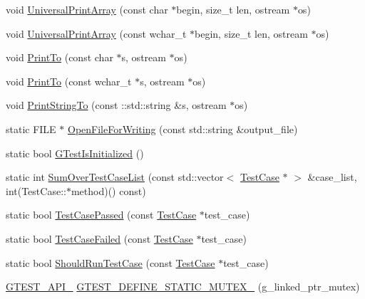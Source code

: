 \begin{DoxyCompactItemize}
\item 
void \mbox{\hyperlink{namespacetesting_1_1internal_a070107e7a8205ad6ec4d538d52b15b38}{Universal\+Print\+Array}} (const char $\ast$begin, size\+\_\+t len, ostream $\ast$os)
\item 
void \mbox{\hyperlink{namespacetesting_1_1internal_a52394019018eb5079f9f1bcca23dcd60}{Universal\+Print\+Array}} (const wchar\+\_\+t $\ast$begin, size\+\_\+t len, ostream $\ast$os)
\item 
void \mbox{\hyperlink{namespacetesting_1_1internal_adc6c98306d40b53fd07be4e295102a0a}{Print\+To}} (const char $\ast$s, ostream $\ast$os)
\item 
void \mbox{\hyperlink{namespacetesting_1_1internal_afc20fb56b2547a8f91f9ff99650f2024}{Print\+To}} (const wchar\+\_\+t $\ast$s, ostream $\ast$os)
\item 
void \mbox{\hyperlink{namespacetesting_1_1internal_ad609167d8d6792b0fb186539e0e159bd}{Print\+String\+To}} (const \+::std\+::string \&s, ostream $\ast$os)
\item 
static F\+I\+LE $\ast$ \mbox{\hyperlink{namespacetesting_1_1internal_ad2067b047293fd5061a48675982d9ff2}{Open\+File\+For\+Writing}} (const std\+::string \&output\+\_\+file)
\item 
static bool \mbox{\hyperlink{namespacetesting_1_1internal_a91e707e0d371fae0224ffd37f0d042af}{G\+Test\+Is\+Initialized}} ()
\item 
static int \mbox{\hyperlink{namespacetesting_1_1internal_ad1b758141e7e064d00a2bf0355c8ee43}{Sum\+Over\+Test\+Case\+List}} (const std\+::vector$<$ \mbox{\hyperlink{classtesting_1_1TestCase}{Test\+Case}} $\ast$ $>$ \&case\+\_\+list, int(Test\+Case\+::$\ast$method)() const)
\item 
static bool \mbox{\hyperlink{namespacetesting_1_1internal_aadc7afca7aab40f7f1d41bc17974459a}{Test\+Case\+Passed}} (const \mbox{\hyperlink{classtesting_1_1TestCase}{Test\+Case}} $\ast$test\+\_\+case)
\item 
static bool \mbox{\hyperlink{namespacetesting_1_1internal_a53454b6089c1c5b25319caa9de6c5c02}{Test\+Case\+Failed}} (const \mbox{\hyperlink{classtesting_1_1TestCase}{Test\+Case}} $\ast$test\+\_\+case)
\item 
static bool \mbox{\hyperlink{namespacetesting_1_1internal_a73e562dfef3eb7b30dfbb7b5e88e6df2}{Should\+Run\+Test\+Case}} (const \mbox{\hyperlink{classtesting_1_1TestCase}{Test\+Case}} $\ast$test\+\_\+case)
\item 
\mbox{\hyperlink{gtest-port_8h_aa73be6f0ba4a7456180a94904ce17790}{G\+T\+E\+S\+T\+\_\+\+A\+P\+I\+\_\+}} \mbox{\hyperlink{namespacetesting_1_1internal_aff419d76acc3727be48d195f927189c9}{G\+T\+E\+S\+T\+\_\+\+D\+E\+F\+I\+N\+E\+\_\+\+S\+T\+A\+T\+I\+C\+\_\+\+M\+U\+T\+E\+X\+\_\+}} (g\+\_\+linked\+\_\+ptr\+\_\+mutex)

\end{DoxyCompactItemize}
